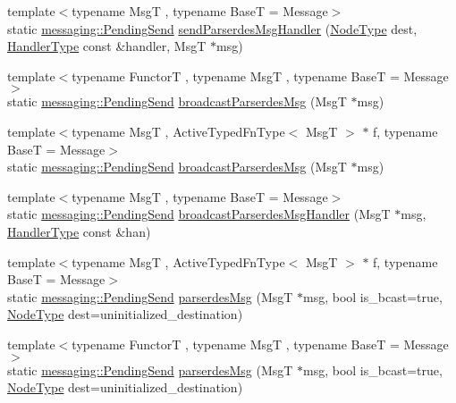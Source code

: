 \begin{DoxyCompactItemize}
\item 
{\footnotesize template$<$typename MsgT , typename BaseT  = Message$>$ }\\static \hyperlink{structvt_1_1messaging_1_1_pending_send}{messaging\+::\+Pending\+Send} \hyperlink{structvt_1_1serialization_1_1_serialized_messenger_a2e66982b0bcb6c2b15d4911d0609f8c7}{send\+Parserdes\+Msg\+Handler} (\hyperlink{namespacevt_a866da9d0efc19c0a1ce79e9e492f47e2}{Node\+Type} dest, \hyperlink{namespacevt_af64846b57dfcaf104da3ef6967917573}{Handler\+Type} const \&handler, MsgT $\ast$msg)
\item 
{\footnotesize template$<$typename FunctorT , typename MsgT , typename BaseT  = Message$>$ }\\static \hyperlink{structvt_1_1messaging_1_1_pending_send}{messaging\+::\+Pending\+Send} \hyperlink{structvt_1_1serialization_1_1_serialized_messenger_aaba58c96e6c29a6b29137fa719c35113}{broadcast\+Parserdes\+Msg} (MsgT $\ast$msg)
\item 
{\footnotesize template$<$typename MsgT , Active\+Typed\+Fn\+Type$<$ Msg\+T $>$ $\ast$ f, typename BaseT  = Message$>$ }\\static \hyperlink{structvt_1_1messaging_1_1_pending_send}{messaging\+::\+Pending\+Send} \hyperlink{structvt_1_1serialization_1_1_serialized_messenger_ab63d7ec8f331ae893e1819e3f6ec9d5c}{broadcast\+Parserdes\+Msg} (MsgT $\ast$msg)
\item 
{\footnotesize template$<$typename MsgT , typename BaseT  = Message$>$ }\\static \hyperlink{structvt_1_1messaging_1_1_pending_send}{messaging\+::\+Pending\+Send} \hyperlink{structvt_1_1serialization_1_1_serialized_messenger_a6ccb2cff955c5ef1f60904b4f35da191}{broadcast\+Parserdes\+Msg\+Handler} (MsgT $\ast$msg, \hyperlink{namespacevt_af64846b57dfcaf104da3ef6967917573}{Handler\+Type} const \&han)
\item 
{\footnotesize template$<$typename MsgT , Active\+Typed\+Fn\+Type$<$ Msg\+T $>$ $\ast$ f, typename BaseT  = Message$>$ }\\static \hyperlink{structvt_1_1messaging_1_1_pending_send}{messaging\+::\+Pending\+Send} \hyperlink{structvt_1_1serialization_1_1_serialized_messenger_a004e1bae5078208d62d432496e0fbf3a}{parserdes\+Msg} (MsgT $\ast$msg, bool is\+\_\+bcast=true, \hyperlink{namespacevt_a866da9d0efc19c0a1ce79e9e492f47e2}{Node\+Type} dest=uninitialized\+\_\+destination)
\item 
{\footnotesize template$<$typename FunctorT , typename MsgT , typename BaseT  = Message$>$ }\\static \hyperlink{structvt_1_1messaging_1_1_pending_send}{messaging\+::\+Pending\+Send} \hyperlink{structvt_1_1serialization_1_1_serialized_messenger_af32e8f605636b373600457f12f363a51}{parserdes\+Msg} (MsgT $\ast$msg, bool is\+\_\+bcast=true, \hyperlink{namespacevt_a866da9d0efc19c0a1ce79e9e492f47e2}{Node\+Type} dest=uninitialized\+\_\+destination)

\end{DoxyCompactItemize}
